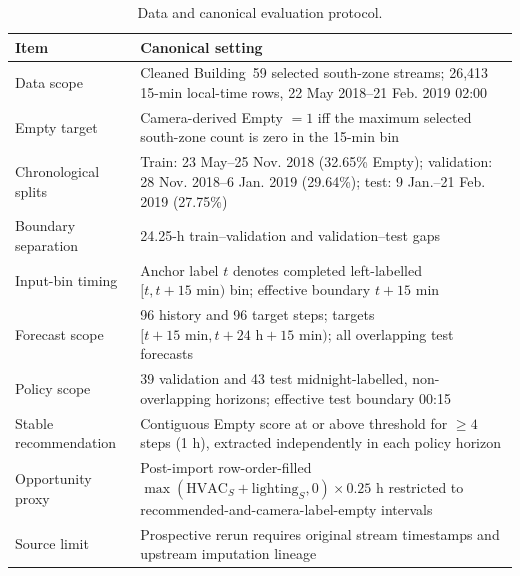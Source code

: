 \begin{table}[!t]
\caption{Data and canonical evaluation protocol.}
\label{tab:protocol}
\centering
\footnotesize
\setlength{\tabcolsep}{3pt}
\begin{tabular}{p{}p{}}
\toprule
Item & Canonical setting \\
\midrule
Data scope & Cleaned Building~59 selected south-zone streams; 26,413 15-min local-time rows, 22 May 2018--21 Feb. 2019 02:00 \\
Empty target & Camera-derived Empty $=1$ iff the maximum selected south-zone count is zero in the 15-min bin \\
Chronological splits & Train: 23 May--25 Nov. 2018 (32.65\% Empty); validation: 28 Nov. 2018--6 Jan. 2019 (29.64\%); test: 9 Jan.--21 Feb. 2019 (27.75\%) \\
Boundary separation & 24.25-h train--validation and validation--test gaps \\
Input-bin timing & Anchor label $t$ denotes completed left-labelled $[t,t+15\text{ min})$ bin; effective boundary $t+15$ min \\
Forecast scope & 96 history and 96 target steps; targets $[t+15\text{ min},t+24\text{ h}+15\text{ min})$; all overlapping test forecasts \\
Policy scope & 39 validation and 43 test midnight-labelled, non-overlapping horizons; effective test boundary 00:15 \\
Stable recommendation & Contiguous Empty score at or above threshold for $\geq4$ steps (1 h), extracted independently in each policy horizon \\
Opportunity proxy & Post-import row-order-filled $\max(\mathrm{HVAC}_{S}+\mathrm{lighting}_{S},0)\times0.25$ h restricted to recommended-and-camera-label-empty intervals \\
Source limit & Prospective rerun requires original stream timestamps and upstream imputation lineage \\
\bottomrule
\end{tabular}
\end{table}
